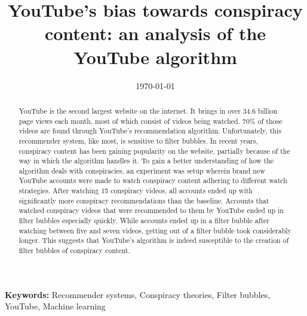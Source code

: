 \documentclass{uva-inf-article}
\title{YouTube's bias towards conspiracy content: an analysis of the YouTube algorithm}
\date{\today}
\begin{document}
\maketitle

\begin{abstract}
    YouTube is the second largest website on the internet. It brings in over 34.6 billion page views each month,
    most of which consist of videos being watched. 70\% of those videos are found through YouTube's 
    recommendation algorithm. Unfortunately, this recommender system, like most, is sensitive to filter bubbles.
    In recent years, conspiracy content has been gaining popularity on the website, partially because of the way
    in which the algorithm handles it. To gain a better understanding of how the algorithm deals with
    conspiracies, an experiment was setup wherein brand new YouTube accounts were made to watch conspiracy
    content adhering to different watch strategies. After watching 15 conspiracy videos, all accounts ended up
    with significantly more conspiracy recommendations than the baseline. Accounts that watched conspiracy 
    videos that were recommended to them by YouTube ended up in filter bubbles especially quickly. While
    accounts ended up in a filter bubble after watching between five and seven videos, getting out of a filter
    bubble took considerably longer. This suggests that YouTube's algorithm is indeed susceptible to the
    creation of filter bubbles of conspiracy content. 
\end{abstract}

{\bf Keywords:} Recommender systems, Conspiracy theories, Filter bubbles, YouTube, Machine learning

\linenumbers















\newpage



\newpage
\nolinenumbers

 

\newpage


\end{document}
